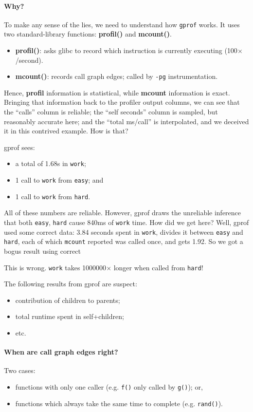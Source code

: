 \documentclass[a4paper]{report}
\begin{document}
\paragraph{Why?} To make any sense of the lies, we need to understand how {\tt gprof} works.
It uses two standard-library functions: {\bf profil()} and {\bf mcount()}.

\begin{itemize}
\item {\bf profil()}: asks glibc to record which instruction 
  is currently executing (100$\times$/second).
\item {\bf mcount()}: records call graph edges; called by {\tt -pg} instrumentation.
\end{itemize}

Hence, {\bf profil} information is statistical, while {\bf mcount}
information is exact.  Bringing that information back to the profiler
output columns, we can see that the ``calls'' column is reliable; the
``self seconds'' column is sampled, but reasonably accurate here; and
the ``total ms/call'' is interpolated, and we deceived it in this
contrived example. How is that?

gprof sees:
\begin{itemize}
    \item a total of 1.68s in {\tt work};
    \item 1 call to {\tt work} from {\tt easy}; and
    \item 1 call to {\tt work} from {\tt hard}.
\end{itemize}
All of these numbers are reliable. However, gprof draws the unreliable inference that
both {\tt easy}, {\tt hard} cause 840ms of {\tt work} time. How did we get here? Well, gprof used some correct data: 3.84 seconds spent in \texttt{work}, divides it between \texttt{easy} and \texttt{hard}, each of which \texttt{mcount} reported was called once, and gets 1.92. So we got a bogus result using correct 

This is wrong. {\tt work} takes 1000000$\times$ longer when called from {\tt hard}!


The following results from gprof are suspect:
\begin{itemize}
  \item contribution of children to parents;
  \item total runtime spent in self+children;
  \item etc.
\end{itemize}

\paragraph{When are call graph edges right?}
Two cases:
    \begin{itemize}
    \item functions with only one caller
      (e.g. {\tt f()} only called by {\tt g()}); or,
    \item functions which always take the same time to complete
      (e.g. {\tt rand()}).
    \end{itemize}
\end{document}
